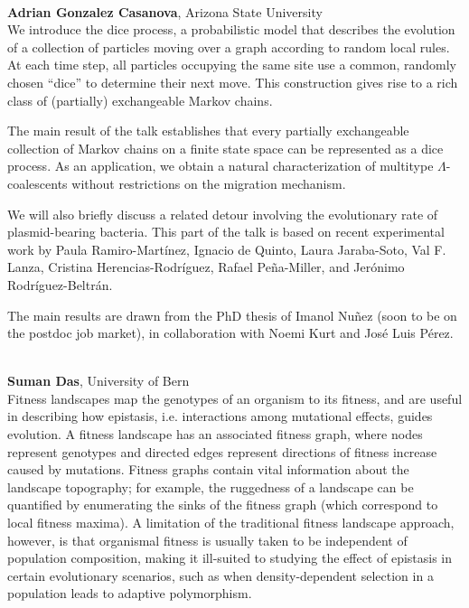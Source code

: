 \documentclass[12pt,a4paper]{article}
\begin{document}
\bigskip\bigskip

\\[1ex]{ \large \textbf{ Adrian Gonzalez Casanova}}, Arizona State University \\[2ex] We introduce the dice process, a probabilistic model that describes the evolution of a collection of particles moving over a graph according to random local rules. At each time step, all particles occupying the same site use a common, randomly chosen “dice” to determine their next move. This construction gives rise to a rich class of (partially) exchangeable Markov chains. 

 The main result of the talk establishes that every partially exchangeable collection of Markov chains on a finite state space can be represented as a dice process. As an application, we obtain a natural characterization of multitype $\Lambda$-coalescents without restrictions on the migration mechanism. 

 We will also briefly discuss a related detour involving the evolutionary rate of plasmid-bearing bacteria. This part of the talk is based on recent experimental work by Paula Ramiro-Martínez, Ignacio de Quinto, Laura Jaraba-Soto, Val F. Lanza, Cristina Herencias-Rodríguez, Rafael Peña-Miller, and Jerónimo Rodríguez-Beltrán. 

 The main results are drawn from the PhD thesis of Imanol Nuñez (soon to be on the postdoc job market), in collaboration with Noemi Kurt and José Luis Pérez. 

\bigskip\bigskip

\\[1ex]{ \large \textbf{ Suman Das}}, University of Bern \\[2ex] Fitness landscapes map the genotypes of an organism to its fitness, and are useful in describing how epistasis, i.e. interactions among mutational effects, guides evolution. A fitness landscape has an associated fitness graph, where nodes represent genotypes and directed edges represent directions of fitness increase caused by mutations. Fitness graphs contain vital information about the landscape topography; for example, the ruggedness of a landscape can be quantified by enumerating the sinks of the fitness graph (which correspond to local fitness maxima). A limitation of the traditional fitness landscape approach, however, is that organismal fitness is usually taken to be independent of population composition, making it ill-suited to studying the effect of epistasis in certain evolutionary scenarios, such as when density-dependent selection in a population leads to adaptive polymorphism.  
\end{document}
